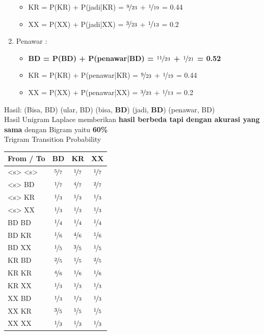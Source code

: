 \documentclass[paper=a4, fontsize=11pt]{scrartcl} %
\numberwithin{equation}{section} %
\numberwithin{figure}{section} %
\numberwithin{table}{section} %
\begin{document}
\begin{enumerate}
\begin{itemize}
		\item KR = P(KR) + P(jadi|KR) = $\nicefrac{9}{23}$ + $\nicefrac{1}{19}$ = 0.44
		\item XX = P(XX) + P(jadi|XX) = $\nicefrac{3}{23}$ + $\nicefrac{1}{13}$ = 0.2
	\end{itemize}
	\item Penawar : 
	\begin{itemize}
		\item \textbf{BD = P(BD) + P(penawar|BD) = $\nicefrac{11}{23}$ + $\nicefrac{1}{21}$ = 0.52}
		\item KR = P(KR) + P(penawar|KR) = $\nicefrac{9}{23}$ + $\nicefrac{1}{19}$ = 0.44
		\item XX = P(XX) + P(penawar|XX) = $\nicefrac{3}{23}$ + $\nicefrac{1}{13}$ = 0.2
	\end{itemize}		
\end{enumerate}

Hasil: (Bisa, BD) (ular, BD) (bisa, \textbf{BD}) (jadi, \textbf{BD}) (penawar, BD) \\
Hasil Unigram Laplace memberikan \textbf{hasil berbeda tapi dengan akurasi yang sama} dengan Bigram yaitu \textbf{60\%} \\

Trigram Transition Probability \\
\begin{tabular}{ | l | c | c | c |}
	\hline
	From / To & BD & KR & XX \\ \hline
	<s> <s> & $\nicefrac{5}{7}$ & $\nicefrac{1}{7}$ & $\nicefrac{1}{7}$ \\ \hline
	<s> BD & $\nicefrac{1}{7}$ & $\nicefrac{4}{7}$ & $\nicefrac{2}{7}$ \\ \hline
	<s> KR & $\nicefrac{1}{3}$ & $\nicefrac{1}{3}$ & $\nicefrac{1}{3}$ \\ \hline
	<s> XX & $\nicefrac{1}{3}$ & $\nicefrac{1}{3}$ & $\nicefrac{1}{3}$ \\ \hline
	BD BD & $\nicefrac{1}{4}$ & $\nicefrac{1}{4}$ & $\nicefrac{1}{4}$ \\ \hline
	BD KR & $\nicefrac{1}{6}$ & $\nicefrac{4}{6}$ & $\nicefrac{1}{6}$ \\ \hline
	BD XX & $\nicefrac{1}{5}$ & $\nicefrac{3}{5}$ & $\nicefrac{1}{5}$ \\ \hline	
	KR BD & $\nicefrac{2}{5}$ & $\nicefrac{1}{5}$ & $\nicefrac{2}{5}$ \\ \hline
	KR KR & $\nicefrac{4}{6}$ & $\nicefrac{1}{6}$ & $\nicefrac{1}{6}$ \\ \hline
	KR XX & $\nicefrac{1}{3}$ & $\nicefrac{1}{3}$ & $\nicefrac{1}{3}$ \\ \hline	
	XX BD & $\nicefrac{1}{3}$ & $\nicefrac{1}{3}$ & $\nicefrac{1}{3}$ \\ \hline
	XX KR & $\nicefrac{3}{5}$ & $\nicefrac{1}{5}$ & $\nicefrac{1}{5}$ \\ \hline
	XX XX & $\nicefrac{1}{3}$ & $\nicefrac{1}{3}$ & $\nicefrac{1}{3}$ \\ \hline		
\end{tabular} \\ [8pt]
\end{document}

